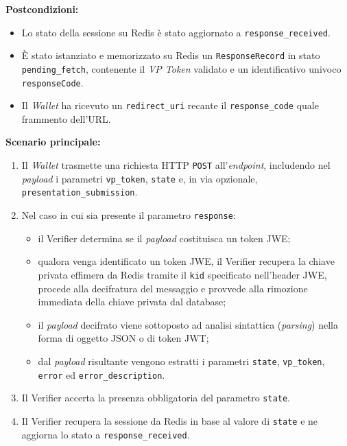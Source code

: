 \noindent\textbf{Postcondizioni:}
\begin{itemize}
    \item Lo stato della sessione su Redis è stato aggiornato a \texttt{response\_\allowbreak{}received}.
    \item È stato istanziato e memorizzato su Redis un \texttt{ResponseRecord} in stato \texttt{pending\_\allowbreak{}fetch}, contenente il \textit{VP Token} validato e un identificativo univoco \texttt{responseCode}.
    \item Il \textit{Wallet} ha ricevuto un \texttt{redirect\_\allowbreak{}uri} recante il \texttt{response\_\allowbreak{}code} quale frammento dell'URL.
\end{itemize}

\noindent\textbf{Scenario principale:}
\begin{enumerate}
    \item Il \textit{Wallet} trasmette una richiesta HTTP \texttt{POST} all'\textit{endpoint}, includendo nel \textit{payload} i parametri \texttt{vp\_\allowbreak{}token}, \texttt{state} e, in via opzionale, \texttt{presentation\_\allowbreak{}submission}.
    \item Nel caso in cui sia presente il parametro \texttt{response}:
    \begin{itemize}
        \item il Verifier determina se il \textit{payload} costituisca un token JWE;
        \item qualora venga identificato un token JWE, il Verifier recupera la chiave privata effimera da Redis tramite il \texttt{kid} specificato nell'header JWE, procede alla decifratura del messaggio e provvede alla rimozione immediata della chiave privata dal database;
        \item il \textit{payload} decifrato viene sottoposto ad analisi sintattica (\textit{parsing}) nella forma di oggetto JSON o di token JWT;
        \item dal \textit{payload} risultante vengono estratti i parametri \texttt{state}, \texttt{vp\_\allowbreak{}token}, \texttt{error} ed \texttt{error\_\allowbreak{}description}.
    \end{itemize}
    \item Il Verifier accerta la presenza obbligatoria del parametro \texttt{state}.
    \item Il Verifier recupera la sessione da Redis in base al valore di \texttt{state} e ne aggiorna lo stato a \texttt{response\_\allowbreak{}received}.

\end{enumerate}
